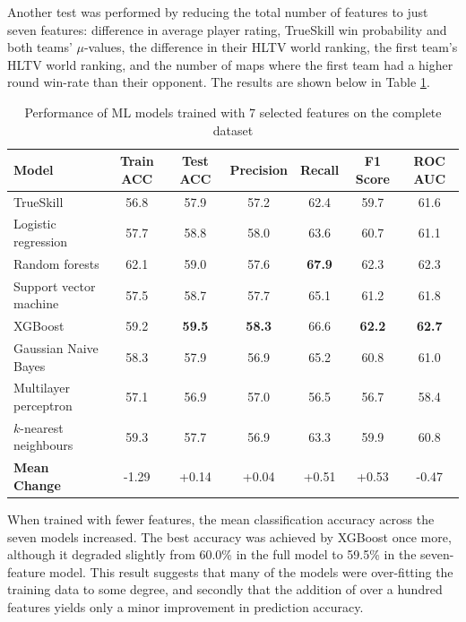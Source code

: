 Another test was performed by reducing the total number of features to just seven features: difference in average player rating, TrueSkill win probability and both teams' $\mu$-values, the difference in their HLTV world ranking, the first team's HLTV world ranking, and the number of maps where the first team had a higher round win-rate than their opponent. The results are shown below in Table \ref{table:7features}.

\begin{table}[h!]
	\centering
	\small
	\begin{adjustbox}{center} %
		\begin{tabular}{ |l|c|c|c|c|c|c| }
			\hline
			\rule{0pt}{2.6ex} \textbf{Model} & \textbf{Train ACC} & \textbf{Test ACC} & \textbf{Precision} & \textbf{Recall} & \textbf{F1 Score} & \textbf{ROC AUC} \\
			\hline
			\rule{0pt}{2.6ex} TrueSkill                 & 56.8 & 57.9 & 57.2 & 62.4 & 59.7 & 61.6 \\ \hline
			\rule{0pt}{2.6ex} Logistic regression 		& 57.7 & 58.8 & 58.0 & 63.6 & 60.7 & 61.1 \\
			\rule{0pt}{2.6ex} Random forests			& 62.1 & 59.0 & 57.6 & \textbf{67.9} & 62.3 & 62.3 \\
			\rule{0pt}{2.6ex} Support vector machine 	& 57.5 & 58.7 & 57.7 & 65.1 & 61.2 & 61.8 \\
			\rule{0pt}{2.6ex} XGBoost 					& 59.2 & \textbf{59.5} & \textbf{58.3} & 66.6 & \textbf{62.2} & \textbf{62.7} \\
			\rule{0pt}{2.6ex} Gaussian Naive Bayes 		& 58.3 & 57.9 & 56.9 & 65.2 & 60.8 & 61.0 \\
			\rule{0pt}{2.6ex} Multilayer perceptron     & 57.1 & 56.9 & 57.0 & 56.5 & 56.7 & 58.4 \\
			\rule{0pt}{2.6ex} $k$-nearest neighbours 	& 59.3 & 57.7 & 56.9 & 63.3 & 59.9 & 60.8 \\
			\hline
			\rule{0pt}{2.6ex} \textbf{Mean Change} 		& -1.29 & +0.14 & +0.04 & +0.51 & +0.53 & -0.47 \\
			\hline
		\end{tabular}
	\end{adjustbox}
	\caption{Performance of ML models trained with 7 selected features on the complete dataset}
	\label{table:7features}
\end{table}

When trained with fewer features, the mean classification accuracy across the seven models increased. The best accuracy was achieved by XGBoost once more, although it degraded slightly from 60.0\% in the full model to 59.5\% in the seven-feature model. This result suggests that many of the models were over-fitting the training data to some degree, and secondly that the addition of over a hundred features yields only a minor improvement in prediction accuracy.

